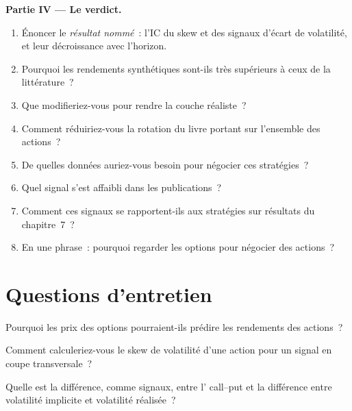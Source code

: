 \begin{problem}
\medskip\noindent\textbf{Partie IV --- Le verdict.}
\begin{enumerate}[resume]
\item Énoncer le \emph{résultat nommé}~: l'IC du skew et des signaux d'écart de volatilité, et leur décroissance avec l'horizon.
\item Pourquoi les rendements synthétiques sont-ils très supérieurs à ceux de la littérature~?
\item Que modifieriez-vous pour rendre la couche réaliste~?
\item Comment réduiriez-vous la rotation du livre portant sur l'ensemble des actions~?
\item De quelles données auriez-vous besoin pour négocier ces stratégies~?
\item Quel signal s'est affaibli dans les publications~?
\item Comment ces signaux se rapportent-ils aux stratégies sur résultats du chapitre~7~?
\item En une phrase~: pourquoi regarder les options pour négocier des actions~?
\end{enumerate}
\end{problem}

\section{Questions d'entretien}

\begin{interviewq}\label{iq:s1:options-implied-signals-for-stocks:1}
Pourquoi les prix des options pourraient-ils prédire les rendements des actions~?
\end{interviewq}

\begin{interviewq}\label{iq:s1:options-implied-signals-for-stocks:2}
Comment calculeriez-vous le skew de volatilité d'une action pour un signal en coupe transversale~?
\end{interviewq}

\begin{interviewq}\label{iq:s1:options-implied-signals-for-stocks:3}
Quelle est la différence, comme signaux, entre l' call--put et la différence entre volatilité implicite et volatilité réalisée~?
\end{interviewq}

